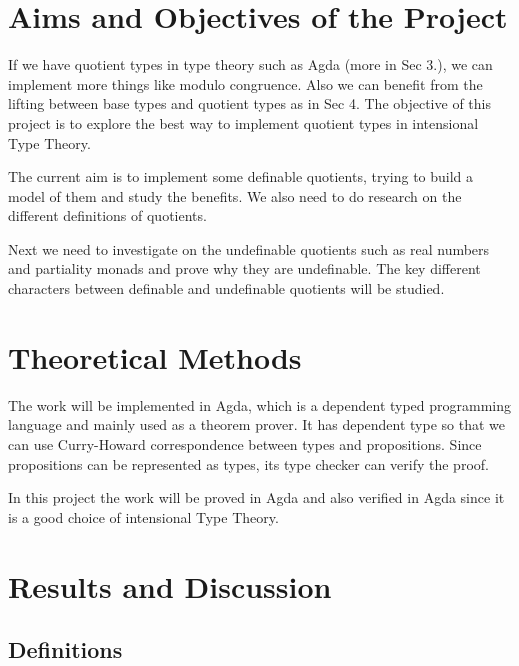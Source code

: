 \documentclass[envcountsame]{llncs}
\begin{document}
\section{Aims and Objectives of the Project}

If we have quotient types in type theory such as Agda (more in Sec 3.), we can implement more things like modulo congruence. Also we can benefit from the lifting between base types and quotient types as in Sec 4.  The objective of this project is to explore the best way to implement quotient types in intensional Type Theory.

% 

The current aim is to implement some definable quotients, trying to build a model of them and study the benefits.
We also need to do research on the different definitions of quotients.

Next we need to investigate on the undefinable quotients such as real numbers and partiality monads and prove why they are undefinable. The key different characters between definable and undefinable quotients will be studied. 
\section{Theoretical Methods}
The work will be implemented in Agda, which is a dependent typed programming language and mainly used as a theorem prover.
It has dependent type so that we can use Curry-Howard correspondence between types and propositions. Since propositions can be represented as types, its type checker can verify the proof.

In this project the work will be proved in Agda and also verified in Agda since it is a good choice of intensional Type Theory.

\section{Results and Discussion}


\subsection{Definitions}
\end{document}
